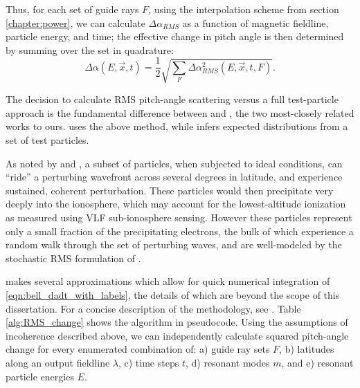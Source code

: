 Thus, for each set of guide rays $F$, using the interpolation scheme from section \ref{chapter:power}, we can calculate $\Delta \alpha_{RMS}$ as a function of magnetic fieldline, particle energy, and time; the effective change in pitch angle is then determined by summing over the set in quadrature: 
\begin{equation}
\Delta \alpha(E, \vec{x}, t) = \frac{1}{2}\sqrt{\sum_{F} \Delta \alpha_{RMS}^2(E, \vec{x},t, F)}.
\end{equation}

The decision to calculate RMS pitch-angle scattering versus a full test-particle approach is the fundamental difference between \cite{Lauben1998} and \cite{Bortnik2005}, the two most-closely related works to ours. \citeauthor{Bortnik2005} uses the above method, while \citeauthor{Lauben1998} infers expected distributions from a set of test particles. 

As noted by \cite{Lauben1998} and \cite{Lauben2001}, a subset of particles, when subjected to ideal conditions, can ``ride'' a perturbing wavefront across several degrees in latitude, and experience sustained, coherent perturbation. These particles would then precipitate very deeply into the ionosphere, which may account for the lowest-altitude ionization as measured using VLF sub-ionosphere sensing. However these particles represent only a small fraction of the precipitating electrons, the bulk of which experience a random walk through the set of perturbing waves, and are well-modeled by the stochastic RMS formulation of \citeauthor{Bortnik2005}.

\citeauthor{Bortnik2005} makes several approximations which allow for quick numerical integration of \eqref{eqn:bell_dadt_with_labels}, the details of which are beyond the scope of this dissertation. For a concise description of the methodology, see \cite{Bortnik2006}. Table \ref{alg:RMS_change} shows the algorithm in pseudocode. Using the assumptions of incoherence described above, we can independently calculate squared pitch-angle change for every enumerated combination of: a) guide ray sets $F$, b) latitudes along an output fieldline $\lambda$, c) time steps $t$, d) resonant modes $m$, and e) resonant particle energies $E$. 

